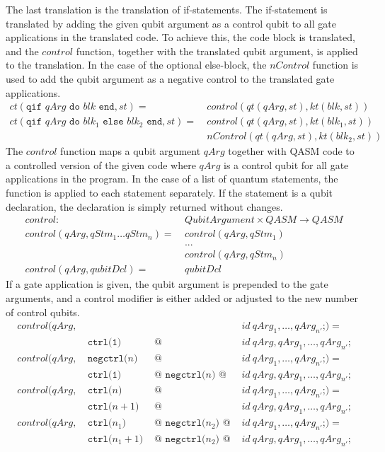 The last translation is the translation of if-statements. The if-statement is translated by adding the given qubit argument as a control qubit to all gate applications in the translated code. To achieve this, the code block is translated, and the $control$ function, together with the translated qubit argument, is applied to the translation. In the case of the optional else-block, the $nControl$ function is used to add the qubit argument as a negative control to the translated gate applications.
\begin{align*}
        ct(\texttt{qif } qArg \texttt{ do } blk \texttt{ end}, st) = \ 
            &  control(qt(qArg, st), kt(blk, st)) \\
        ct(\texttt{qif } qArg \texttt{ do } blk_1 \texttt{ else } blk_2 \texttt{ end}, st) = \ 
            &  control(qt(qArg, st), kt(blk_1, st)) \\
            &  nControl(qt(qArg, st), kt(blk_2, st))
\end{align*}
The $control$ function maps a qubit argument $qArg$ together with QASM code to a controlled version of the given code where $qArg$ is a control qubit for all gate applications in the program. In the case of a list of quantum statements, the function is applied to each statement separately. If the statement is a qubit declaration, the declaration is simply returned without changes.
\begin{align*}
    control : \ & QubitArgument \times QASM \to QASM\\
    control(qArg, qStm_1 \dots qStm_n) = \ & control(qArg, qStm_1)\\
        & ...\\
        & control(qArg, qStm_n)\\
    control(qArg, qubitDcl) = \ & qubitDcl
\end{align*}
If a gate application is given, the qubit argument is prepended to the gate arguments, and a control modifier is either added or adjusted to the new number of control qubits.
\begin{align*}
    control(qArg, & &&  id \ qArg_1, \dots, qArg_{n'} \texttt{;}) = \\  
    & \ \texttt{ctrl(1) } &\texttt{@ }& id \ qArg, qArg_1, \dots, qArg_{n'}\texttt{;}\\
    control(qArg, & \ \texttt{negctrl(}n\texttt{) } &\texttt{@ }& id \ qArg_1, \dots, qArg_{n'} \texttt{;}) = \\
    & \ \texttt{ctrl(1) } &\texttt{@ } \texttt{negctrl(}n\texttt{) } \texttt{@ }&id \ qArg, qArg_1, \dots, qArg_{n'}\texttt{;}\\
    control(qArg, & \ \texttt{ctrl(}n \texttt{) } &\texttt{@ }& id \ qArg_1, \dots, qArg_{n'} \texttt{;}) = \\
    & \ \texttt{ctrl(}n+1 \texttt{) } &\texttt{@ }& id \ qArg, qArg_1, \dots, qArg_{n'}\texttt{;}\\
    control(qArg, & \ \texttt{ctrl(}n_1 \texttt{) } & \texttt{@ } \texttt{negctrl(}n_2\texttt{) } \texttt{@ }& id \ qArg_1, \dots, qArg_{n'} \texttt{;}) = \\
    & \ \texttt{ctrl(}n_1+1 \texttt{) } &\texttt{@ } \texttt{negctrl(}n_2\texttt{) } \texttt{@ }& id \ qArg, qArg_1, \dots, qArg_{n'}\texttt{;}
\end{align*}
